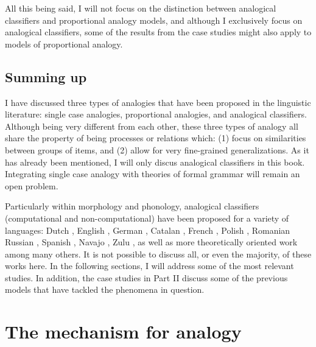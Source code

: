 All this being said, I will not focus on the distinction between analogical classifiers and proportional analogy models, and although I exclusively focus on analogical classifiers, some of the results from the case studies might also apply to models of proportional analogy.



\subsection{Summing up}

I have discussed three types of analogies that have been proposed in the linguistic literature: single case analogies, proportional analogies, and analogical classifiers. Although being very different from each other, these three types of analogy all share the property of being processes or relations which: (1) focus on similarities between groups of items, and (2) allow for very fine-grained generalizations. As it has already been mentioned, I will only discus analogical classifiers in this book. Integrating single case analogy with theories of formal grammar will remain an open problem.

Particularly within morphology and phonology, analogical classifiers (computational and non-computational) have been proposed for a variety of languages: Dutch \autocite{Krott.2001}, English \autocites{Bybee.1982, Arndt-Lappe.2011, Arndt-Lappe.2014}, German \autocites{Hahn.2000, Motsch.1977, Kopcke.1988, Kopcke.1998, Schlucker.2011}, Catalan \autocites{Valles.2004, Saldanya.2005}, French \autocite{Holmes.2004, Lyster.2006, Matthews.2005, Matthews.2010}, Polish \autocite{Czaplicki.2013}, Romanian \autocites{Dinu.2012, Vrabie.1989, Vrabie.2000} Russian \autocite{Kapatsinski.2010, Gouskova.2015}, Spanish \autocites{Afonso.2014, Eddington.2002, Eddington.2004, Eddington.2009, Pountain.2006, Rainer.1993, Rainer.2013, Smead.2000}, Navajo \autocite{Eddington.2006}, Zulu \autocite{OBryan.1974}, as well as more theoretically oriented work \autocites{Skousen.1989, Skousen.2002, Skousen.2013} among many others. It is not possible to discuss all, or even the majority, of these works here. In the following sections, I will address some of the most relevant studies. In addition, the case studies in Part II discuss some of the previous models that have tackled the phenomena in question.

\section{The mechanism for analogy}\label{sec:mechanisms-analogy}


